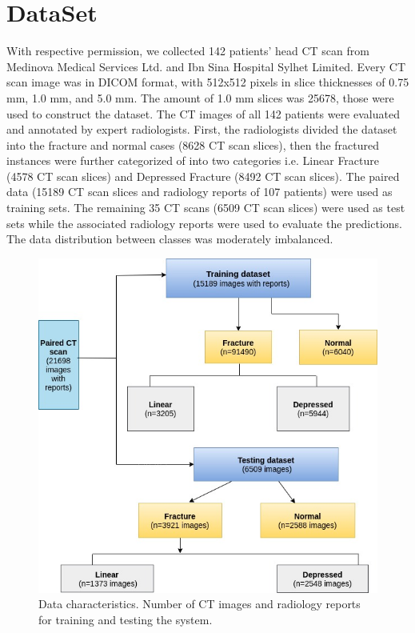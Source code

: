 \documentclass[sigconf]{acmart}
\begin{document}
\section{DataSet}
With respective permission, we collected 142 patients' head CT scan from Medinova Medical Services Ltd.\cite{medinova} and Ibn Sina Hospital Sylhet Limited.\cite{ibnsina} Every CT scan image was in DICOM format, with 512x512 pixels in slice thicknesses of 0.75 mm, 1.0 mm, and 5.0 mm. The amount of 1.0 mm slices was 25678, those were used to construct the dataset. The CT images of all 142 patients were evaluated and annotated by expert radiologists. 
First, the radiologists divided the dataset into the fracture and normal cases (8628 CT scan slices), then the fractured instances were further categorized of into two categories i.e. Linear Fracture (4578 CT scan slices) and Depressed Fracture (8492 CT scan slices). The paired data (15189 CT scan slices and radiology reports of 107 patients) were used as training sets. The remaining 35 CT scans (6509 CT scan slices) were used as test sets while the associated radiology reports were used to evaluate the predictions. The data distribution between classes was moderately imbalanced.
\begin{figure}[h]
  \centering
  
  \includegraphics[width=\linewidth]{../supplements/ddd.jpg}
 
 \caption{Data characteristics. Number of CT images and
radiology reports for training and testing the system.}
  \label{Fig.1}
\end{figure}
\end{document}
